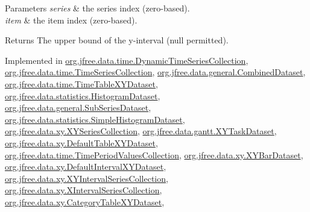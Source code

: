 \begin{DoxyParams}{Parameters}
{\em series} & the series index (zero-\/based). \\
\hline
{\em item} & the item index (zero-\/based).\\
\hline
\end{DoxyParams}
\begin{DoxyReturn}{Returns}
The upper bound of the y-\/interval ({\ttfamily null} permitted). 
\end{DoxyReturn}


Implemented in \mbox{\hyperlink{classorg_1_1jfree_1_1data_1_1time_1_1_dynamic_time_series_collection_a06eb703a8006848633a99341f68a24c4}{org.\+jfree.\+data.\+time.\+Dynamic\+Time\+Series\+Collection}}, \mbox{\hyperlink{classorg_1_1jfree_1_1data_1_1time_1_1_time_series_collection_af7975c0f5e474a5daac76d2313a23f19}{org.\+jfree.\+data.\+time.\+Time\+Series\+Collection}}, \mbox{\hyperlink{classorg_1_1jfree_1_1data_1_1general_1_1_combined_dataset_a6a2884b2c6d9b9e538a984b9aa99efe1}{org.\+jfree.\+data.\+general.\+Combined\+Dataset}}, \mbox{\hyperlink{classorg_1_1jfree_1_1data_1_1time_1_1_time_table_x_y_dataset_aa5852bdf77d8d13d5b5a0ef5c8e138e7}{org.\+jfree.\+data.\+time.\+Time\+Table\+X\+Y\+Dataset}}, \mbox{\hyperlink{classorg_1_1jfree_1_1data_1_1statistics_1_1_histogram_dataset_a3bf9d22d1d5a7d47ca3746c706198afe}{org.\+jfree.\+data.\+statistics.\+Histogram\+Dataset}}, \mbox{\hyperlink{classorg_1_1jfree_1_1data_1_1general_1_1_sub_series_dataset_a616e968d5eacad03afd3871044c5022e}{org.\+jfree.\+data.\+general.\+Sub\+Series\+Dataset}}, \mbox{\hyperlink{classorg_1_1jfree_1_1data_1_1statistics_1_1_simple_histogram_dataset_ae046f2a1b89f4a3cf42ffd21e8b0ed0f}{org.\+jfree.\+data.\+statistics.\+Simple\+Histogram\+Dataset}}, \mbox{\hyperlink{classorg_1_1jfree_1_1data_1_1xy_1_1_x_y_series_collection_a4c7808581b7aa99391293de0a7cb0cc4}{org.\+jfree.\+data.\+xy.\+X\+Y\+Series\+Collection}}, \mbox{\hyperlink{classorg_1_1jfree_1_1data_1_1gantt_1_1_x_y_task_dataset_a615ce13ed04f817b4b816cd9915b024e}{org.\+jfree.\+data.\+gantt.\+X\+Y\+Task\+Dataset}}, \mbox{\hyperlink{classorg_1_1jfree_1_1data_1_1xy_1_1_default_table_x_y_dataset_ae0d28b2da1af879209a1c47c07ab3141}{org.\+jfree.\+data.\+xy.\+Default\+Table\+X\+Y\+Dataset}}, \mbox{\hyperlink{classorg_1_1jfree_1_1data_1_1time_1_1_time_period_values_collection_a79bc6031731fb19cb9c1aa7fd605a951}{org.\+jfree.\+data.\+time.\+Time\+Period\+Values\+Collection}}, \mbox{\hyperlink{classorg_1_1jfree_1_1data_1_1xy_1_1_x_y_bar_dataset_a35b633397a23d1e009bca8b35fb3d4d8}{org.\+jfree.\+data.\+xy.\+X\+Y\+Bar\+Dataset}}, \mbox{\hyperlink{classorg_1_1jfree_1_1data_1_1xy_1_1_default_interval_x_y_dataset_aed7774df9c641523b66b02e176b813ed}{org.\+jfree.\+data.\+xy.\+Default\+Interval\+X\+Y\+Dataset}}, \mbox{\hyperlink{classorg_1_1jfree_1_1data_1_1xy_1_1_x_y_interval_series_collection_abba1f60de92dc0c6d7bda0d064c04d70}{org.\+jfree.\+data.\+xy.\+X\+Y\+Interval\+Series\+Collection}}, \mbox{\hyperlink{classorg_1_1jfree_1_1data_1_1xy_1_1_x_interval_series_collection_aea748f575e39ffb8faf923a15d7f3792}{org.\+jfree.\+data.\+xy.\+X\+Interval\+Series\+Collection}}, \mbox{\hyperlink{classorg_1_1jfree_1_1data_1_1xy_1_1_category_table_x_y_dataset_a3b33bd6fe3e1cdd39ded107e410bb594}{org.\+jfree.\+data.\+xy.\+Category\+Table\+X\+Y\+Dataset}}, 